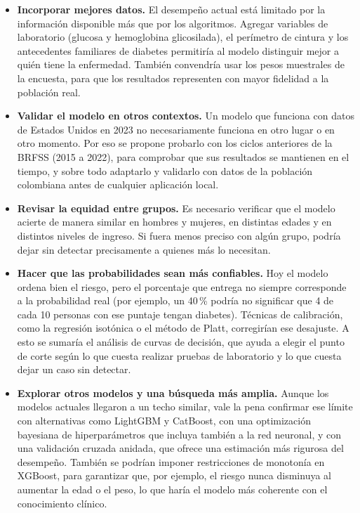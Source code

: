 \documentclass[conference,a4paper]{IEEEtran}
\begin{document}
\begin{itemize}
\item \textbf{Incorporar mejores datos.} El desempeño actual está limitado por la información disponible más que por los algoritmos. Agregar variables de laboratorio (glucosa y hemoglobina glicosilada), el perímetro de cintura y los antecedentes familiares de diabetes permitiría al modelo distinguir mejor a quién tiene la enfermedad. También convendría usar los pesos muestrales de la encuesta, para que los resultados representen con mayor fidelidad a la población real.

\item \textbf{Validar el modelo en otros contextos.} Un modelo que funciona con datos de Estados Unidos en 2023 no necesariamente funciona en otro lugar o en otro momento. Por eso se propone probarlo con los ciclos anteriores de la BRFSS (2015 a 2022), para comprobar que sus resultados se mantienen en el tiempo, y sobre todo adaptarlo y validarlo con datos de la población colombiana antes de cualquier aplicación local.

\item \textbf{Revisar la equidad entre grupos.} Es necesario verificar que el modelo acierte de manera similar en hombres y mujeres, en distintas edades y en distintos niveles de ingreso. Si fuera menos preciso con algún grupo, podría dejar sin detectar precisamente a quienes más lo necesitan.

\item \textbf{Hacer que las probabilidades sean más confiables.} Hoy el modelo ordena bien el riesgo, pero el porcentaje que entrega no siempre corresponde a la probabilidad real (por ejemplo, un 40\,\% podría no significar que 4 de cada 10 personas con ese puntaje tengan diabetes). Técnicas de calibración, como la regresión isotónica o el método de Platt, corregirían ese desajuste. A esto se sumaría el análisis de curvas de decisión, que ayuda a elegir el punto de corte según lo que cuesta realizar pruebas de laboratorio y lo que cuesta dejar un caso sin detectar.

\item \textbf{Explorar otros modelos y una búsqueda más amplia.} Aunque los modelos actuales llegaron a un techo similar, vale la pena confirmar ese límite con alternativas como LightGBM y CatBoost, con una optimización bayesiana de hiperparámetros que incluya también a la red neuronal, y con una validación cruzada anidada, que ofrece una estimación más rigurosa del desempeño. También se podrían imponer restricciones de monotonía en XGBoost, para garantizar que, por ejemplo, el riesgo nunca disminuya al aumentar la edad o el peso, lo que haría el modelo más coherente con el conocimiento clínico.


\end{itemize}
\end{document}
